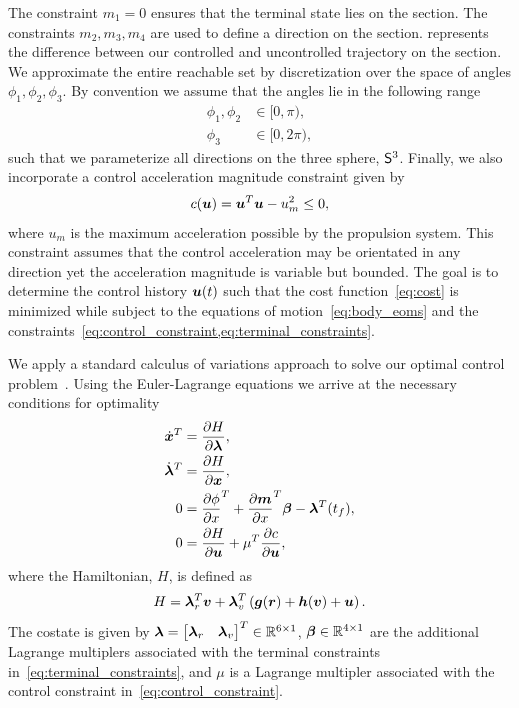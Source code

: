 \documentclass[]{aiaa-tc}%
\begin{document}
The constraint \( m_1 = 0 \) ensures that the terminal state lies on the \Poincare section.
The constraints \( m_2, m_3, m_4 \) are used to define a direction on the \Poincare section.
 represents the difference between our controlled and uncontrolled trajectory on the \Poincare section.
We approximate the entire reachable set by discretization  over the space of angles \(\phi_1, \phi_2, \phi_3 \).
By convention we assume that the angles lie in the following range
\begin{align*}
    \phi_1, \phi_2 &\in [ 0, \pi ) ,\\
    \phi_3 &\in [ 0 , 2 \pi ) ,
\end{align*}
such that we parameterize all directions on the three sphere, \(\S^3\).
Finally, we also incorporate a control acceleration magnitude constraint given by
\begin{align}\label{eq:control_constraint}
    c(\vecbf{u}) = \vecbf{u}^T \vecbf{u} - u_m^2 \leq 0 ,
\end{align}
where \( u_m \) is the maximum acceleration possible by the propulsion system.
This constraint assumes that the control acceleration may be orientated in any direction yet the acceleration magnitude is variable but bounded.
The goal is to determine the control history \( \vecbf{u}(t) \) such that the cost function~\cref{eq:cost} is minimized while subject to the equations of motion~\cref{eq:body_eoms} and the constraints~\cref{eq:control_constraint,eq:terminal_constraints}.

We apply a standard calculus of variations approach to solve our optimal control problem~\cite{bryson1975}.
Using the Euler-Lagrange equations we arrive at the necessary conditions for optimality
\begin{align}\label{eq:necc_conditions}
    \begin{split}
        \dot{\vecbf{x}} ^T &= \deriv{H}{\vecbf{\lambda}} ,\\
        \dot{\vecbf{\lambda}}^T &= \deriv{H}{\vecbf{x}} , \\
        0 &= \deriv{\phi}{x}^T + \deriv{\vecbf{m}}{x}^T \vecbf{\beta} - \vecbf{\lambda}^T(t_f) , \\
        0 &= \deriv{H}{\vecbf{u}} + \mu^T \deriv{c}{\vecbf{u}} ,
    \end{split}
\end{align}
where the Hamiltonian, \( H\), is defined as
\begin{align}\label{eq:hamiltonian}
    H = \vecbf{\lambda}_r^T \vecbf{v} + \vecbf{\lambda}_v^T \parenth{\vecbf{g}(\vecbf{r}) + \vecbf{h}(\vecbf{v}) + \vecbf{u}}.
\end{align}
The costate is given by \( \vecbf{\lambda} = \begin{bmatrix} \vecbf{\lambda}_r & \vecbf{\lambda}_v \end{bmatrix}^T \in \R^{6 \times 1}\), \( \vecbf{\beta} \in \R^{4 \times 1} \) are the additional Lagrange multiplers associated with the terminal constraints in~\cref{eq:terminal_constraints}, and \( \mu \) is a Lagrange multipler associated with the control constraint in~\cref{eq:control_constraint}.
\end{document}
